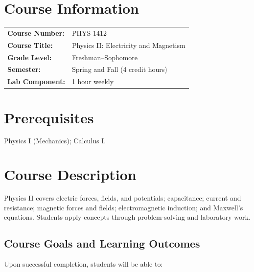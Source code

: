 \documentclass[12pt,oneside]{book}
\begin{document}
\section{Course Information}

\begin{tabular}{ll}
\textbf{Course Number:} & PHYS 1412 \\
\textbf{Course Title:} & Physics II: Electricity and Magnetism \\
\textbf{Grade Level:} & Freshman--Sophomore \\
\textbf{Semester:} & Spring and Fall (4 credit hours) \\
\textbf{Lab Component:} & 1 hour weekly \\
\end{tabular}

\section{Prerequisites}

Physics I (Mechanics); Calculus I.

\section{Course Description}

Physics II covers electric forces, fields, and potentials; capacitance; current and resistance; magnetic forces and fields; electromagnetic induction; and Maxwell's equations. Students apply concepts through problem-solving and laboratory work.

\subsection{Course Goals and Learning Outcomes}

Upon successful completion, students will be able to:
\end{document}
